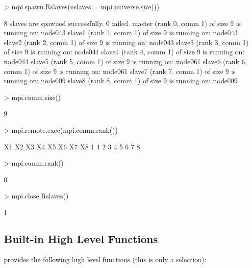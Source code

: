 \begin{Example}

\begin{Schunk}
\begin{Sinput}
> mpi.spawn.Rslaves(nslaves = mpi.universe.size())
\end{Sinput}
\begin{Soutput}
	8 slaves are spawned successfully. 0 failed.
master (rank 0, comm 1) of size 9 is running on: node043 
slave1 (rank 1, comm 1) of size 9 is running on: node043 
slave2 (rank 2, comm 1) of size 9 is running on: node043 
slave3 (rank 3, comm 1) of size 9 is running on: node044 
slave4 (rank 4, comm 1) of size 9 is running on: node044 
slave5 (rank 5, comm 1) of size 9 is running on: node061 
slave6 (rank 6, comm 1) of size 9 is running on: node061 
slave7 (rank 7, comm 1) of size 9 is running on: node009 
slave8 (rank 8, comm 1) of size 9 is running on: node009 
\end{Soutput}
\begin{Sinput}
> mpi.comm.size()
\end{Sinput}
\begin{Soutput}
[1] 9
\end{Soutput}
\begin{Sinput}
> mpi.remote.exec(mpi.comm.rank())
\end{Sinput}
\begin{Soutput}
  X1 X2 X3 X4 X5 X6 X7 X8
1  1  2  3  4  5  6  7  8
\end{Soutput}
\begin{Sinput}
> mpi.comm.rank()
\end{Sinput}
\begin{Soutput}
[1] 0
\end{Soutput}
\begin{Sinput}
> mpi.close.Rslaves()
\end{Sinput}
\begin{Soutput}
[1] 1
\end{Soutput}
\end{Schunk}
\label{ex:Rmpi2}
\end{Example}
 
\subsection{Built-in High Level Functions}

 provides the following high level functions (this is only a
selection):

